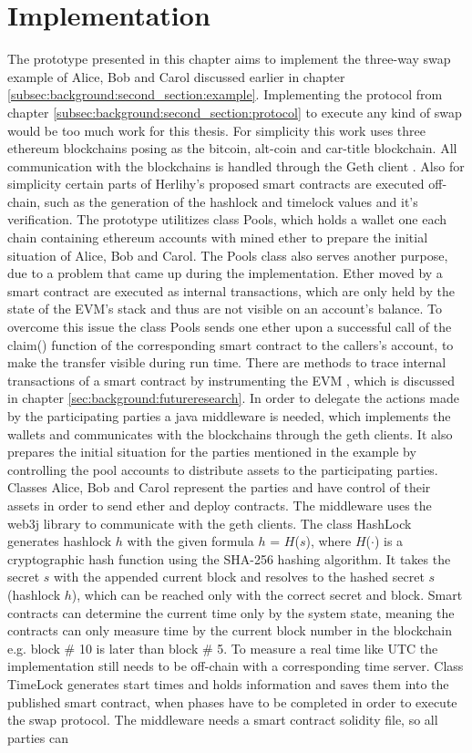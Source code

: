 \chapter{Implementation}
\label{ch:chapter04}
The prototype presented in this chapter aims to implement the three-way swap example of Alice, Bob and Carol discussed earlier in chapter \ref{subsec:background:second_section:example}. Implementing the protocol from chapter \ref{subsec:background:second_section:protocol} to execute any kind of swap would be too much work for this thesis. For simplicity this work uses three ethereum blockchains posing as the bitcoin, alt-coin and car-title blockchain. All communication with the blockchains is handled through the Geth client \cite{gethclient}. Also for simplicity certain parts of Herlihy's proposed smart contracts are executed off-chain, such as the generation of the hashlock and timelock values and it's verification. The prototype utilitizes class Pools, which holds a wallet one each chain containing ethereum accounts with mined ether to prepare the initial situation of Alice, Bob and Carol. The Pools class also serves another purpose, due to a problem that came up during the implementation. Ether moved by a smart contract are executed as internal transactions, which are only held by the state of the \ac{EVM}'s stack and thus are not visible on an account's balance. To overcome this issue the class Pools sends one ether upon a successful call of the claim() function of the corresponding smart contract to the callers's account, to make the transfer visible during run time. There are methods to trace internal transactions of a smart contract by instrumenting the \ac{EVM} \cite{instrumentingEVM}, which is discussed in chapter \ref{sec:background:futureresearch}. In order to delegate the actions made by the participating parties a java middleware is needed, which implements the wallets and communicates with the blockchains through the geth clients. It also prepares the initial situation for the parties mentioned in the example by controlling the pool accounts to distribute assets to the participating parties. Classes Alice, Bob and Carol represent the parties and have control of their assets in order to send ether and deploy contracts. The middleware uses the web3j library \cite{web3j} to communicate with the geth clients. The class HashLock generates hashlock $h$ with the given formula $h$ = $H$($s$), where $H$($\cdot$) is a cryptographic hash function using the \ac{SHA-256} hashing algorithm. It takes the secret $s$ with the appended current block and resolves to the hashed secret $s$ (hashlock $h$), which can be reached only with the correct secret and block. Smart contracts can determine the current time only by the system state, meaning the contracts can only measure time by the current block number in the blockchain e.g. block \# 10 is later than block \# 5. To measure a real time like \ac{UTC} the implementation still needs to be off-chain with a corresponding time server. Class TimeLock generates start times and holds information and saves them into the published smart contract, when phases have to be completed in order to execute the swap protocol. The middleware needs a smart contract solidity file, so all parties can 